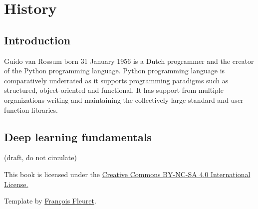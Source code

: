 \documentclass[oneside,11pt]{memoir}
\begin{document}

\part{History}



\chapter{Introduction}
Guido van Rossum born 31 January 1956 is a Dutch programmer and the creator of the Python programming language. Python programming language is comparatively underrated as it supports programming paradigms such as structured, object-oriented and functional. It has support from multiple organizations writing and maintaining the collectively large standard and user function libraries.



\chapter{Deep learning fundamentals}






\printindex


\newpage


\ifdefined\draft
\begin{center}
  {\color{red} (draft, do not circulate)}
\end{center}
\else
This book is licensed under the
\href{https://creativecommons.org/licenses/by-nc-sa/4.0/}{Creative
  Commons BY-NC-SA 4.0 International License.}
\fi

Template by \href{https://fleuret.org/francois/}{François Fleuret}.



\checknbdrafts
\end{document}
